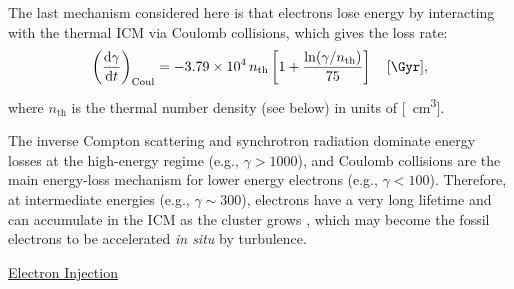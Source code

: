 \documentclass[modern]{aastex61}
\newcommand{\R}[1]{\mathrm{#1}}
\newcommand{\D}[1]{\R{d} #1}
\newcommand{\diff}[2]{\frac{\D{#1}}{\D{#2}}}
\begin{document}
The last mechanism considered here is that electrons lose energy
by interacting with the thermal ICM via Coulomb collisions, which gives
the loss rate:
\begin{equation}
  \label{eq:eloss-coul}
  \left( \diff{\gamma}{t} \right)_{\R{Coul}} =
  \num{-3.79e4} \,n_{\R{th}} \left[ 1 +
    \frac{\ln(\gamma/n_{\R{th}})}{75} \right] \quad [\si{\per\Gyr}],
\end{equation}
where $n_{\R{th}}$ is the thermal number density (see below)
in units of [\si{\per\cm\cubed}].

The inverse Compton scattering and synchrotron radiation dominate
energy losses at the high-energy regime (e.g., $\gamma > 1000$),
and Coulomb collisions are the main energy-loss mechanism for lower
energy electrons (e.g., $\gamma < 100$).
Therefore, at intermediate energies (e.g., $\gamma \sim 300$),
electrons have a very long lifetime and can accumulate in the ICM
as the cluster grows \citep{sarazin1999}, which may become the fossil
electrons to be accelerated \emph{in situ} by turbulence.

\vspace{1ex}
\uline{Electron Injection}
\end{document}
